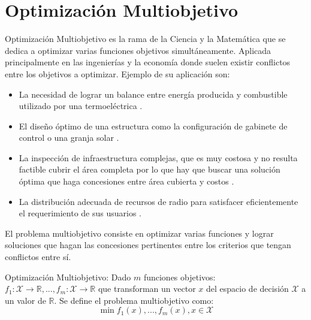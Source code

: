 \section{Optimizaci\'on Multiobjetivo}\label{background:moo}
Optimizaci\'on Multiobjetivo es la rama de la Ciencia y la Matem\'atica que se dedica a optimizar varias funciones objetivos simult\'aneamente. Aplicada principalmente en las ingenier\'ias y la econom\'ia donde  suelen existir conflictos entre los objetivos a optimizar. Ejemplo de su aplicaci\'on son: %
\begin{itemize}
    \item La necesidad de lograr un balance entre energ\'ia producida y combustible utilizado por una termoel\'ectrica .
    \item El dise\~no \'optimo de una estructura como la configuraci\'on de gabinete de control  o una granja solar .
    \item La inspecci\'on de infraestructura complejas, que es muy costosa y no resulta factible cubrir el \'area completa por lo que hay que buscar una soluci\'on \'optima que haga concesiones entre \'area cubierta y costos .
    \item La distribuci\'on adecuada de recursos de radio para satisfacer eficientemente el requerimiento de sus usuarios .
\end{itemize}

El problema multiobjetivo consiste en optimizar varias funciones y lograr soluciones que hagan las concesiones pertinentes entre los criterios que tengan conflictos entre s\'i.
\begin{definition}{Optimizaci\'on Multiobjetivo:}
    \label{background:def:moo}
     Dado $m$ funciones objetivos: $f_1: \mathcal{X} \rightarrow \mathbb{R}, ..., f_m: \mathcal{X} \rightarrow \mathbb{R}$ que transforman un vector $x$ del espacio de decisi\'on $\mathcal{X}$ a un valor de $\mathbb{R}$. Se define el problema multiobjetivo como:
    \begin{equation*}
        \min f_1(x), ..., f_m(x), x \in \mathcal{X}
    \end{equation*}
\end{definition}

